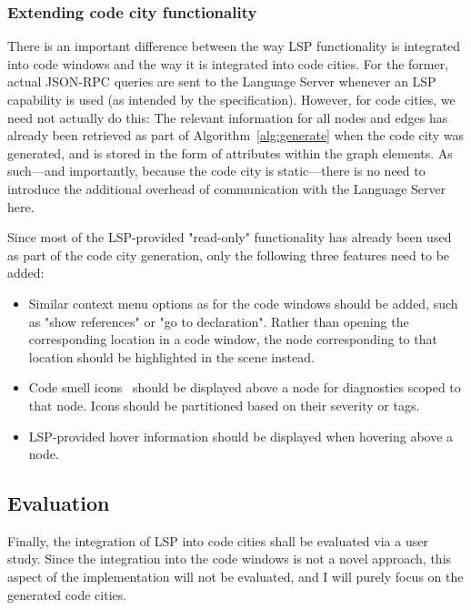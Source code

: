 \documentclass{scrartcl}
\begin{document}
{\subsubsection{Extending code city functionality}\label{subsubsec:city}
There is an important difference between the way LSP functionality is integrated into code windows and the way it is integrated into code cities.
For the former, actual JSON-RPC queries are sent to the Language Server whenever an LSP capability is used (as intended by the specification).
However, for code cities, we need not actually do this:
The relevant information for all nodes and edges has already been retrieved as part of Algorithm~\ref{alg:generate} when the code city was generated, and is stored in the form of attributes within the graph elements.
As such---and importantly, because the code city is static---there is no need to introduce the additional overhead of communication with the Language Server here.

Since most of the LSP-provided "read-only" functionality has already been used as part of the code city generation, only the following three features need to be added:
\begin{itemize}
  \item Similar context menu options as for the code windows should be added, such as "show references" or "go to declaration".
    Rather than opening the corresponding location in a code window, the node corresponding to that location should be highlighted in the scene instead.
  \item Code smell icons~\cite{falko} should be displayed above a node for diagnostics scoped to that node.
    Icons should be partitioned based on their severity or tags.
  \item LSP-provided hover information should be displayed when hovering above a node.
\end{itemize}


\subsection{Evaluation}\label{subsec:evaluation}
Finally, the integration of LSP into code cities shall be evaluated via a user study.
Since the integration into the code windows is not a novel approach, this aspect of the implementation will not be evaluated, and I will purely focus on the generated code cities.

}
\end{document}
